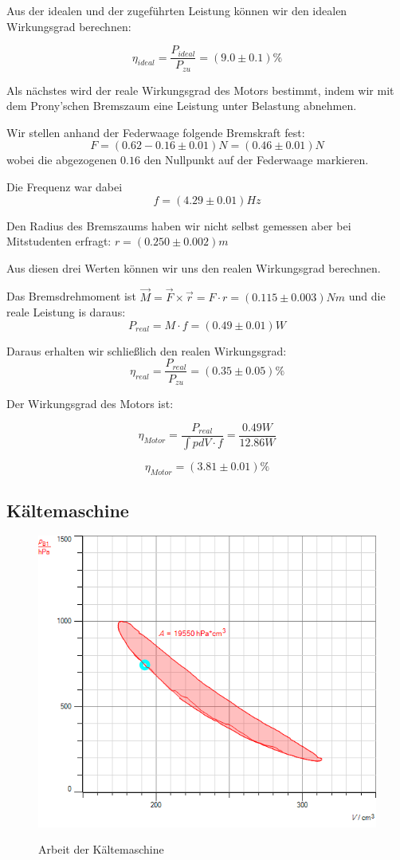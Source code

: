 \documentclass[12pt,a4paper,twopage]{article}
\begin{document}
Aus der idealen und der zugeführten Leistung können wir den idealen Wirkungsgrad berechnen:

$$\boxed{\eta_{ideal}=\frac{P_{ideal}}{P_{zu}}=(9.0 \pm 0.1)\%}$$

Als nächstes wird der reale Wirkungsgrad des Motors bestimmt, indem wir mit dem Prony'schen Bremszaum eine Leistung unter Belastung abnehmen.

Wir stellen anhand der Federwaage folgende Bremskraft fest:
$$F=(0.62-0.16 \pm 0.01)N=(0.46 \pm 0.01)N$$
wobei die abgezogenen $0.16$ den Nullpunkt auf der Federwaage markieren.

Die Frequenz war dabei
$$f=(4.29 \pm 0.01)Hz$$

Den Radius des Bremszaums haben wir nicht selbst gemessen aber bei Mitstudenten erfragt: $r=(0.250 \pm 0.002)m$

Aus diesen drei Werten können wir uns den realen Wirkungsgrad berechnen.

Das Bremsdrehmoment ist $\vec{M}=\vec{F}\times \vec{r}=F\cdot r = (0.115 \pm 0.003)Nm$ und die reale Leistung is daraus:
$$\boxed{P_{real}=M\cdot f=(0.49 \pm 0.01)W}$$

Daraus erhalten wir schließlich den realen Wirkungsgrad:
$$\boxed{\eta_{real}=\frac{P_{real}}{P_{zu}}=(0.35 \pm 0.05)\%}$$

Der Wirkungsgrad des Motors ist:

$$\eta_{Motor}=\frac{P_{real}}{\int pdV \cdot f} = \frac{0.49W}{12.86W} $$

$$\boxed{ \eta_{Motor}=(3.81 \pm 0.01) \% }$$
\subsection{Kältemaschine}

\begin{center}
\begin{figure}[H]
\includegraphics[scale=0.7]{bachgraf/kaeltemaschine.png}
\label{kaeltemaschine-pv}
\caption{Arbeit der Kältemaschine}
\end{figure}
\end{center}
\end{document}
